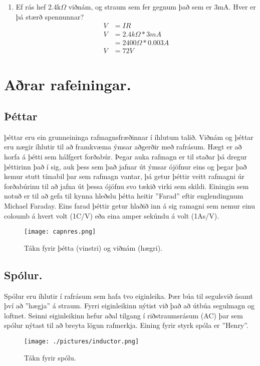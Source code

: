 \begin{enumerate}
	\begin{enumerate}
		\item Ef rás hef 2.4k$\Omega$ viðnám, og straum sem fer gegnum það sem er 3mA. Hver er þá stærð spennunnar?
		\begin{equation}
			\begin{split}
			V&=IR \\
			V&=2.4k\Omega*3mA \\
			&=2400\Omega*0.003A \\
			V&=72V
			\end{split}
		\end{equation}
	\end{enumerate}
\end{enumerate}

\section{Aðrar rafeiningar.}
\subsection{Þéttar}
þéttar eru ein grunneininga rafmagnsfræðinnar í íhlutum talið. Viðnám og þéttar eru nægir íhlutir til að framkvæma ýmsar
aðgerðir með rafrásum. Hægt er að horfa á þétti sem hálfgert forðabúr. Þegar auka rafmagn er til staðar þá dregur þéttirinn
það í sig, auk þess sem það jafnar út ýmsar ójöfnur eins og þegar það kemur stutt tímabil þar sem rafmagn vantar, þá getur þéttir
veitt rafmagni úr forðabúrinu til að jafna út þessa ójöfnu svo tækið virki sem skildi. Einingin sem notuð er til að gefa til kynna
hleðslu þétta heitir ''Farad'' eftir englendingnum Michael Faraday. Eins farad þéttir getur hlaðið inn á sig ramagni sem nemur einu coloumb á hvert volt (1C/V) 
eða eina amper sekúndu á volt (1As/V).
\begin{figure}[htb]
	\center
		\texttt{[image: capnres.png]}
		\caption{Tákn fyrir þétta (vinstri) og viðnám (hægri).}
\end{figure}

\subsection{Spólur.}
Spólur eru íhlutir í rafrásum sem hafa tvo eiginleika. Þær búa til segulsvið ásamt því að ''hægja'' á straum. Fyrri eiginleikinn nýtist við það að útbúa 
segulmagn og loftnet. Seinni eiginleikinn hefur aðal tilgang í riðstraumsrásum (AC) þar sem spólur nýtast til að breyta lögun rafmerkja. Eining fyrir styrk
spóla er ''Henry''.
\begin{figure}[htb]
	\center
		\texttt{[image: ./pictures/inductor.png]}
		\caption{Tákn fyrir spólu.}
\end{figure}

